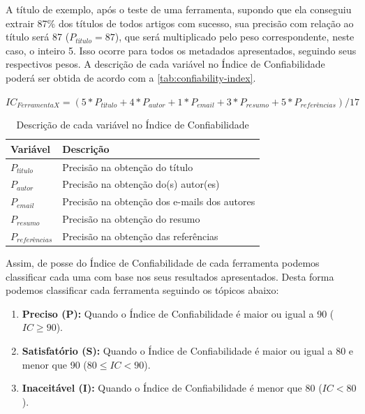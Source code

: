 A título de exemplo, após o teste de uma ferramenta, supondo que ela conseguiu extrair 87\% dos títulos de todos artigos com sucesso, sua precisão com relação ao título será 87 ($P_{título}=87$), que será multiplicado pelo peso correspondente, neste caso, o inteiro 5. Isso ocorre para todos os metadados apresentados, seguindo seus respectivos pesos. A descrição de cada variável no Índice de Confiabilidade poderá ser obtida de acordo com a \autoref{tab:confiability-index}.

\begin{center}
    $ IC_{Ferramenta X}=(5*P_{título}+4*P_{autor}+1*P_{email}+3*P_{resumo}+5*P_{referências}) / 17 $
\end{center}

\begin{table}
    \caption{Descrição de cada variável no Índice de Confiabilidade}
    \begin{center}
        \begin{tabular}{|p{3cm}|p{8cm}|}
            \hline \textbf{Variável} & \textbf{Descrição}\\ 
            \hline $P_{título}$ & Precisão na obtenção do título \\
            \hline $P_{autor}$ & Precisão na obtenção do(s) autor(es)\\
            \hline $P_{email}$ & Precisão na obtenção dos e-mails dos autores \\
            \hline $P_{resumo}$ & Precisão na obtenção do resumo \\
            \hline $P_{referências}$ & Precisão na obtenção das referências \\
            \hline 
        \end{tabular} 
    \end{center}
    \label{tab:confiability-index}
\end{table}

Assim, de posse do Índice de Confiabilidade de cada ferramenta podemos classificar cada uma com base nos seus resultados apresentados. Desta forma podemos classificar cada ferramenta seguindo os tópicos abaixo:

\begin{enumerate}
    \item \textbf{Preciso (P):} Quando o Índice de Confiabilidade é maior ou igual a 90 ($IC\geq90$).
    \item \textbf{Satisfatório (S):} Quando o Índice de Confiabilidade é maior ou igual a 80 e menor que 90 ($80 \leq IC < 90$).
    \item \textbf{Inaceitável (I):} Quando o Índice de Confiabilidade é menor que 80 ($IC < 80$).
\end{enumerate}

